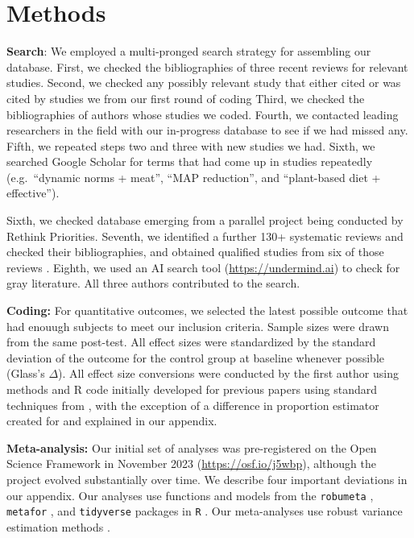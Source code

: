 \documentclass[sn-nature,pdflatex]{sn-jnl}
\begin{document}
\section{Methods}\label{sec3}

\textbf{Search}: We employed a multi-pronged search strategy for
assembling our database. First, we checked the bibliographies of three
recent reviews
\citep{mathur2021meta, bianchi2018conscious, bianchi2018restructuring}
for relevant studies. Second, we checked any possibly relevant study
that either cited or was cited by studies we from our first round of
coding Third, we checked the bibliographies of authors whose studies we
coded. Fourth, we contacted leading researchers in the field with our
in-progress database to see if we had missed any. Fifth, we repeated
steps two and three with new studies we had. Sixth, we searched Google
Scholar for terms that had come up in studies repeatedly (e.g.~``dynamic
norms + meat'', ``MAP reduction'', and ``plant-based diet +
effective'').

\begin{comment} 
does this need more description? This is not entirely reproducible I think but TBH it was not a major source of studies in our database
\end{comment}

Sixth, we checked database emerging from a parallel project being
conducted by Rethink Priorities. Seventh, we identified a further 130+
systematic reviews and checked their bibliographies, and obtained
qualified studies from six of those reviews
\citep{ammann2023, chang2023, DiGennaro2024, harguess2020, ronto2022, wynes2018}.
Eighth, we used an AI search tool (\url{https://undermind.ai}) to check
for gray literature. All three authors contributed to the search.

\textbf{Coding:} For quantitative outcomes, we selected the latest
possible outcome that had enouugh subjects to meet our inclusion
criteria. Sample sizes were drawn from the same post-test. All effect
sizes were standardized by the standard deviation of the outcome for the
control group at baseline whenever possible (Glass's \(\Delta\)). All
effect size conversions were conducted by the first author using methods
and R code initially developed for previous papers
\citep{paluck2019, paluck2021, porat2024} using standard techniques from
\citep{cooper2019}, with the exception of a difference in proportion
estimator created for \citep{paluck2021} and explained in our appendix.

\textbf{Meta-analysis:} Our initial set of analyses was pre-registered
on the Open Science Framework in November 2023
(\url{https://osf.io/j5wbp}), although the project evolved substantially
over time. We describe four important deviations in our appendix. Our
analyses use functions and models from the \texttt{robumeta}
\citep{fisher2015}, \texttt{metafor} \citep{viechtbauer2010}, and
\texttt{tidyverse} \citep{wickham2019} packages in \texttt{R}
\citep{Rlang}. Our meta-analyses use robust variance estimation methods
\citep{hedges2010}.
\end{document}
